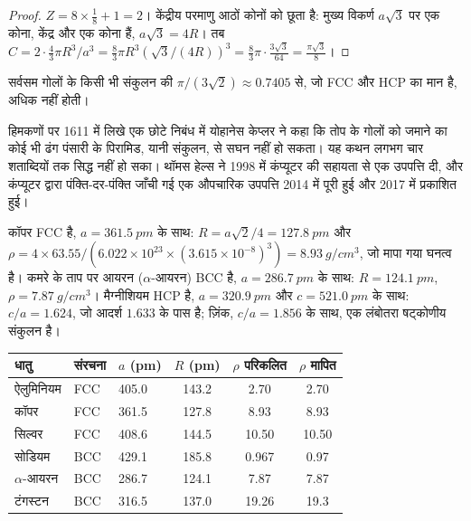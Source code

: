 \begin{proof}
$Z = 8 \times \frac18 + 1 = 2$। केंद्रीय परमाणु आठों
कोनों को छूता है: मुख्य विकर्ण $a\sqrt3$ पर एक कोना, केंद्र और एक
कोना हैं, $a\sqrt3 = 4R$। तब $C = 2 \cdot \frac43\pi R^3/a^3 =
\frac83\pi R^3 (\sqrt3/(4R))^3 = \frac83\pi \cdot \frac{3\sqrt3}{64} =
\frac{\pi\sqrt3}{8}$।
\end{proof}

\begin{proposition}\label{prop:b1:crystals-metals:kepler}
सर्वसम गोलों के किसी भी संकुलन की 
$\pi/(3\sqrt2) \approx 0.7405$ से, जो FCC और HCP का मान है, अधिक नहीं होती।
\end{proposition}
\admitted

\begin{history}[केप्लर का अनुमान, 1611--2017]
हिमकणों पर 1611 में लिखे एक छोटे निबंध में योहानेस केप्लर ने कहा
कि तोप के गोलों को जमाने का कोई भी ढंग पंसारी के पिरामिड, यानी
 संकुलन, से सघन नहीं हो सकता। यह कथन लगभग चार शताब्दियों तक
सिद्ध नहीं हो सका। थॉमस हेल्स ने 1998 में कंप्यूटर की सहायता से एक उपपत्ति दी,
और कंप्यूटर द्वारा पंक्ति-दर-पंक्ति जाँची गई एक औपचारिक उपपत्ति 2014 में पूरी हुई
और 2017 में प्रकाशित हुई।
\end{history}

\begin{example}[तीन धातुएँ]\label{ex:b1:crystals-metals:metals}
कॉपर FCC है, $a = \qty{361.5}{pm}$ के साथ: $R = a\sqrt2/4 =
\qty{127.8}{pm}$ और $\rho = 4 \times 63.55/(6.022 \times 10^{23} \times
(3.615 \times 10^{-8})^3) = \qty{8.93}{g/cm^3}$, जो मापा गया घनत्व है।
कमरे के ताप पर आयरन ($\alpha$-आयरन) BCC है, $a = \qty{286.7}{pm}$ के साथ:
$R = \qty{124.1}{pm}$, $\rho = \qty{7.87}{g/cm^3}$। मैग्नीशियम HCP है,
$a = \qty{320.9}{pm}$ और $c = \qty{521.0}{pm}$ के साथ: $c/a = 1.624$, जो
आदर्श $1.633$ के पास है; ज़िंक, $c/a = 1.856$ के साथ, एक लंबोतरा षट्कोणीय
संकुलन है।
\end{example}

\begin{center}
\small
\begin{tabular}{lllccc}
\hline
धातु & संरचना & $a$ (pm) & $R$ (pm) & $\rho$ परिकलित & $\rho$ मापित \\
\hline
ऐलुमिनियम & FCC & 405.0 & 143.2 & 2.70 & 2.70 \\
कॉपर & FCC & 361.5 & 127.8 & 8.93 & 8.93 \\
सिल्वर & FCC & 408.6 & 144.5 & 10.50 & 10.50 \\
सोडियम & BCC & 429.1 & 185.8 & 0.967 & 0.97 \\
$\alpha$-आयरन & BCC & 286.7 & 124.1 & 7.87 & 7.87 \\
टंगस्टन & BCC & 316.5 & 137.0 & 19.26 & 19.3 \\
\hline
\end{tabular}
\end{center}

